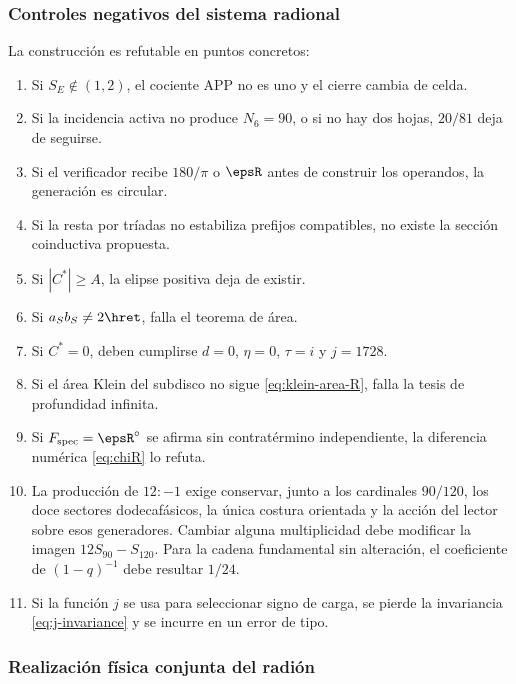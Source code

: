 \subsubsection{Controles negativos del sistema radional}

La construcción es refutable en puntos concretos:
\begin{enumerate}
\item Si \(S_E\notin(1,2)\), el cociente APP no es uno y el cierre cambia de
celda.
\item Si la incidencia activa no produce \(N_6=90\), o si no hay dos hojas,
\(20/81\) deja de seguirse.
\item Si el verificador recibe \(180/\pi\) o \(\epsR\) antes de construir los
operandos, la generación es circular.
\item Si la resta por tríadas no estabiliza prefijos compatibles, no existe
la sección coinductiva propuesta.
\item Si \(|C^*|\ge A\), la elipse positiva deja de existir.
\item Si \(a_Sb_S\ne2\hret\), falla el teorema de área.
\item Si \(C^*=0\), deben cumplirse \(d=0\), \(\eta=0\), \(\tau=i\) y
\(j=1728\).
\item Si el área Klein del subdisco no sigue \eqref{eq:klein-area-R}, falla la
tesis de profundidad infinita.
\item Si \(F_{\mathrm{spec}}=\epsR^\circ\) se afirma sin contratérmino independiente, la
diferencia numérica \eqref{eq:chiR} lo refuta.
\item La producción de \(12:-1\) exige conservar, junto a los cardinales
\(90/120\), los doce sectores dodecafásicos, la única costura orientada y
la acción del lector sobre esos generadores. Cambiar alguna multiplicidad
debe modificar la imagen \(12S_{90}-S_{120}\). Para la cadena fundamental
sin alteración, el coeficiente de \((1-q)^{-1}\) debe resultar \(1/24\).
\item Si la función \(j\) se usa para seleccionar signo de carga, se pierde
la invariancia \eqref{eq:j-invariance} y se incurre en un error de tipo.
\end{enumerate}

\subsubsection{Realización física conjunta del radión}

